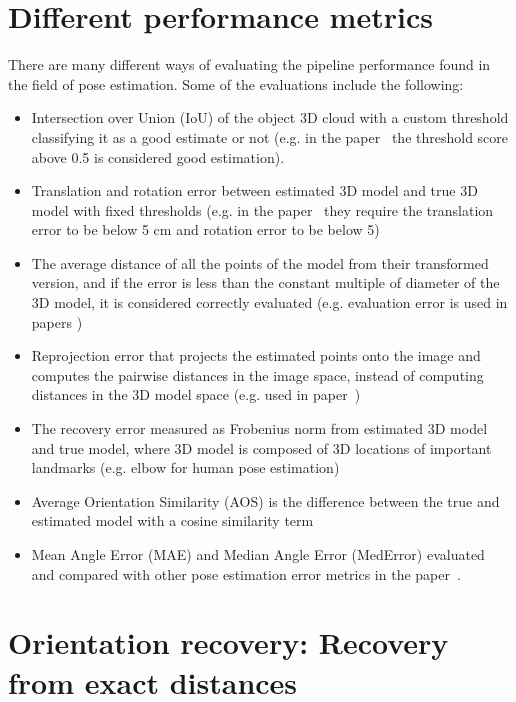 \clearpage

\section{Different performance metrics}\label{apx:metrics-review}
There are many different ways of evaluating the pipeline performance found in the field of pose estimation. Some of the evaluations include the following:
 
\begin{itemize}
\item Intersection over Union (IoU) of the object 3D cloud with a custom threshold classifying it as a good estimate or not (e.g. in the paper~\cite{10.1007/s11263-014-0733-5} the threshold score above 0.5 is considered good estimation).
\item Translation and rotation error between estimated 3D model and true 3D model with fixed thresholds (e.g. in the paper~\cite{shotton2013scene} they require the translation error to be below 5 cm and rotation error to be below 5\degree)
\item The average distance of all the points of the model from their transformed version, and if the error is less than the constant multiple of diameter of the 3D model, it is considered correctly evaluated (e.g. evaluation error is used in papers \cite{10.1007/978-3-642-37331-2_42, xiang2018posecnn})
\item Reprojection error that projects the estimated points onto the image and computes the pairwise distances in the image space, instead of computing distances in the 3D model space (e.g. used in paper~\cite{xiang2018posecnn})
\item The recovery error measured as Frobenius norm from estimated 3D model and true model, where 3D model is composed of 3D locations of important landmarks (e.g. elbow for human pose estimation)~\cite{wangni2018monocular}
\item Average Orientation Similarity (AOS) is the difference between the true and estimated model with a cosine similarity term~\cite{RedondoCabrera2016PoseEE}
\item Mean Angle Error (MAE) and Median Angle Error (MedError) evaluated and compared with other pose estimation error metrics in the paper~\cite{RedondoCabrera2016PoseEE}.
\end{itemize}

\section{Orientation recovery: Recovery from exact distances}\label{apx:results:orientation-recovery:exact}

